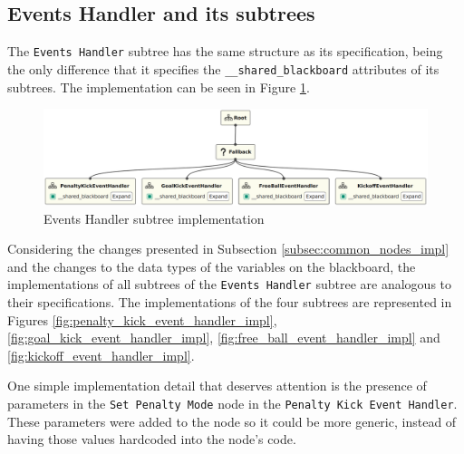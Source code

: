 \subsection{Events Handler and its subtrees}

The \texttt{Events Handler} subtree has the same structure as its specification, being the only difference that it specifies the \texttt{\_\_shared\_blackboard} attributes of its subtrees. The implementation can be seen in Figure \ref{fig:events_handler_impl}.

\begin{figure}[!h]
    \centering
    \includegraphics[width=1.0\linewidth]{chapters/development/images/EventsHandler.png}
    \caption{Events Handler subtree implementation}
    \label{fig:events_handler_impl}
\end{figure}

Considering the changes presented in Subsection \ref{subsec:common_nodes_impl} and the changes to the data types of the variables on the blackboard, the implementations of all subtrees of the \texttt{Events Handler} subtree are analogous to their specifications. The implementations of the four subtrees are represented in Figures \ref{fig:penalty_kick_event_handler_impl}, \ref{fig:goal_kick_event_handler_impl}, \ref{fig:free_ball_event_handler_impl} and \ref{fig:kickoff_event_handler_impl}.

One simple implementation detail that deserves attention is the presence of parameters in the \texttt{Set Penalty Mode} node in the \texttt{Penalty Kick Event Handler}. These parameters were added to the node so it could be more generic, instead of having those values hardcoded into the node's code.


